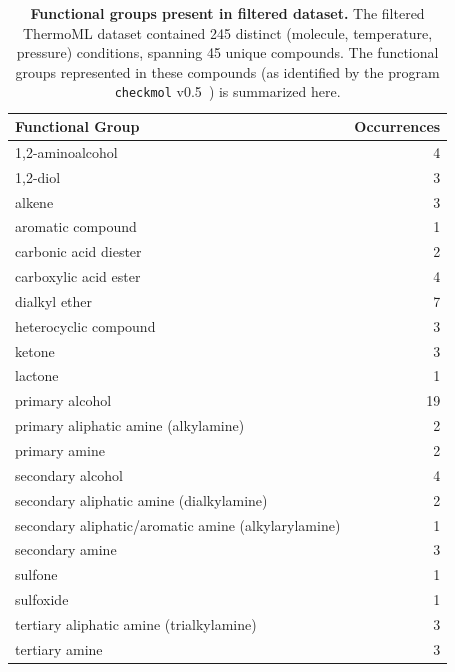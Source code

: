 \documentclass[aps,pre,twocolumn,nofootinbib,superscriptaddress,linenumbers]{revtex4-1}
\begin{document}
\begin{table}
\begin{tabular}{lr}
\toprule
{\bf Functional Group} &    {\bf Occurrences} \\
\midrule
1,2-aminoalcohol                                    &   4 \\
1,2-diol                                            &   3 \\
alkene                                              &   3 \\
aromatic compound                                   &   1 \\
carbonic acid diester                               &   2 \\
carboxylic acid ester                               &   4 \\
dialkyl ether                                       &   7 \\
heterocyclic compound                               &   3 \\
ketone                                              &   3 \\
lactone                                             &   1 \\
primary alcohol                                     &  19 \\
primary aliphatic amine (alkylamine)                &   2 \\
primary amine                                       &   2 \\
secondary alcohol                                   &   4 \\
secondary aliphatic amine (dialkylamine)            &   2 \\
secondary aliphatic/aromatic amine (alkylarylamine) &   1 \\
secondary amine                                     &   3 \\
sulfone                                             &   1 \\
sulfoxide                                           &   1 \\
tertiary aliphatic amine (trialkylamine)            &   3 \\
tertiary amine                                      &   3 \\
\bottomrule
\end{tabular}
\caption{{\bf Functional groups present in filtered dataset.}  
The filtered ThermoML dataset contained 245 distinct (molecule, temperature, pressure) conditions, spanning 45 unique compounds.
The functional groups represented in these compounds (as identified by the program {\tt checkmol} v0.5~\cite{haider2010functionality}) is summarized here.
}
\label{table:FunctionalGroups}
\end{table}
\end{document}
